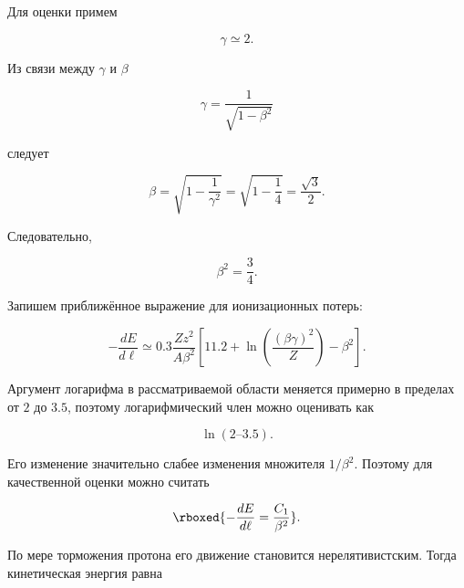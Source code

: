 \documentclass[../final.tex]{subfiles}
\begin{document}
Для оценки примем

\begin{equation*}
    \gamma
    \simeq
    2.
\end{equation*}

Из связи между $\gamma$ и $\beta$

\begin{equation*}
    \gamma
    =
    \frac{1}{
        \sqrt{
            1-\beta^2
        }
    }
\end{equation*}

следует

\begin{equation*}
    \beta
    =
    \sqrt{
        1-
        \frac{1}{\gamma^2}
    }
    =
    \sqrt{
        1-
        \frac14
    }
    =
    \frac{\sqrt3}{2}.
\end{equation*}

Следовательно,

\begin{equation*}
    \beta^2
    =
    \frac34.
\end{equation*}

Запишем приближённое выражение для ионизационных потерь:

\begin{equation*}
    -
    \frac{dE}{d\ell}
    \simeq
    0.3
    \frac{
        Zz^2
    }{
        A\beta^2
    }
    \left[
        11.2
        +
        \ln
        \left(
            \frac{
                (\beta\gamma)^2
            }{
                Z
            }
        \right)
        -
        \beta^2
    \right].
\end{equation*}

Аргумент логарифма в рассматриваемой области меняется
примерно в пределах от $2$ до $3.5$, поэтому логарифмический
член можно оценивать как

\begin{equation*}
    \ln(2\text{--}3.5).
\end{equation*}

Его изменение значительно слабее изменения множителя
$1/\beta^2$. Поэтому для качественной оценки можно считать

\begin{equation*}
    \rboxed{
        -
        \frac{dE}{d\ell}
        =
        \frac{C_1}{\beta^2}
    }.
\end{equation*}

По мере торможения протона его движение становится
нерелятивистским. Тогда кинетическая энергия равна
\end{document}
